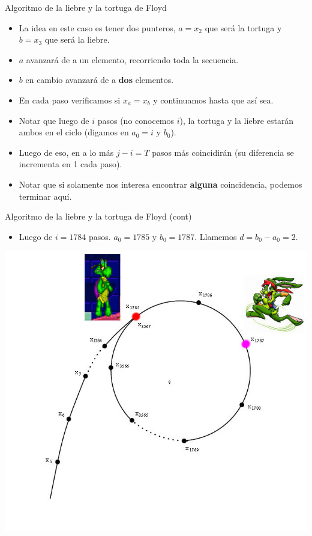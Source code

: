 \documentclass{beamer}
\begin{document}
\begin{frame}{Algoritmo de la liebre y la tortuga de Floyd}
    \begin{itemize}
    \item La idea en este caso es tener dos punteros, $a=x_2$ que será la tortuga y $b=x_3$ que será la liebre.
    \item $a$ avanzará de a un elemento, recorriendo toda la secuencia.
    \item $b$ en cambio avanzará de a \textbf{dos} elementos.
    \item En cada paso verificamos si $x_a = x_b$ y continuamos hasta que así sea.
    \item Notar que luego de $i$ pasos (no conocemos $i$), la tortuga y la liebre estarán ambos en el ciclo (digamos en $a_0=i$ y $b_0$).
    \item Luego de eso, en a lo más $j-i=T$ pasos más coincidirán (su diferencia se incrementa en 1 cada paso).
    \item Notar que si solamente nos interesa encontrar \textbf{alguna} coincidencia, podemos terminar aquí.
    \end{itemize}
\end{frame}

\begin{frame}{Algoritmo de la liebre y la tortuga de Floyd (cont)}
    \begin{itemize}
    \item Luego de $i=1784$ pasos. $a_0=1785$ y $b_0=1787$. Llamemos $d=b_0-a_0=2$.
    \end{itemize}
    {\hfill \includegraphics[scale=0.35]{hare_tortoise_rho_cycle1.jpg} \hfill}
\end{frame}
\end{document}
